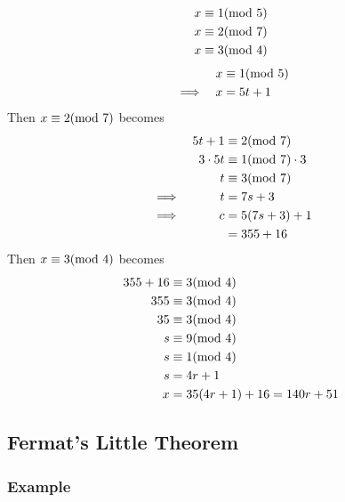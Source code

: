 \documentclass{article}
\begin{document}
\begin{alignat*}{1}
	x & \equiv 1 ( \text{mod } 5 ) \\
	x & \equiv 2 ( \text{mod } 7 ) \\
	x & \equiv 3 ( \text{mod } 4 )
\end{alignat*}
\begin{alignat*}{2}
	 &          & x & \equiv 1(\text{mod } 5) \\
	 & \implies & x & = 5t + 1
\end{alignat*}
Then $ x \equiv 2(\text{mod } 7) $ becomes
\begin{alignat*}{2}
	 &          & 5t + 1     & \equiv 2(\text{mod } 7)         \\
	 &          & 3 \cdot 5t & \equiv 1(\text{mod } 7) \cdot 3 \\
	 &          & t          & \equiv 3(\text{mod } 7)         \\
	 & \implies & t          & = 7s + 3                     \\
	 & \implies & c          & = 5(7s + 3) + 1              \\
	 &          &            & = 355 + 16
\end{alignat*}
Then $ x \equiv 3(\text{mod } 4) $ becomes
\begin{align*}
	355 + 16 & \equiv 3(\text{mod } 4)          \\
	355      & \equiv 3(\text{mod } 4)          \\
	35       & \equiv 3(\text{mod } 4)          \\
	s        & \equiv 9(\text{mod } 4)          \\
	s        & \equiv 1(\text{mod } 4)          \\
	s        & = 4r + 1                      \\
	x        & = 35(4r + 1) + 16 = 140r + 51
\end{align*}

\subsection{Fermat's Little Theorem}

\subsubsection{Example}
\end{document}
